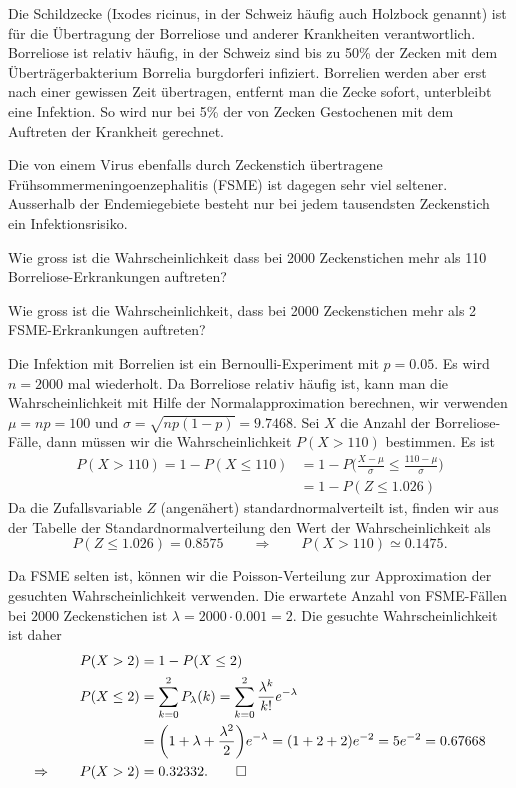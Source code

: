 Die Schildzecke (Ixodes ricinus, in der Schweiz häufig auch Holzbock genannt) 
ist für die Über\-tragung der Borreliose und anderer Krankheiten verantwortlich.
Borreliose ist relativ häufig, in der Schweiz sind bis zu 50\% der Zecken mit
dem Überträgerbakterium Borrelia burgdorferi infiziert.
Borrelien werden aber erst nach einer gewissen Zeit übertragen,
entfernt man die Zecke sofort, unterbleibt eine Infektion.
So wird nur bei 5\% der von Zecken Gestochenen mit dem Auftreten
der Krankheit gerechnet.

Die von einem Virus ebenfalls durch Zeckenstich übertragene
Frühsommermeningoenzephalitis (FSME) ist dagegen sehr viel seltener.
Ausserhalb der Endemiegebiete besteht nur bei jedem tausendsten Zeckenstich
ein Infektionsrisiko.

\begin{teilaufgaben}
\item
Wie gross ist die Wahrscheinlichkeit dass bei 2000 Zeckenstichen mehr als 110
Borreliose-Erkrankungen auftreten?
\item
Wie gross ist die Wahrscheinlichkeit, dass bei 2000 Zeckenstichen mehr als 2
FSME-Er\-kran\-kun\-gen auftreten?
\end{teilaufgaben}

\begin{loesung}
\begin{teilaufgaben}
\item
Die Infektion mit Borrelien ist ein Bernoulli-Experiment mit $p=0.05$.
Es wird $n=2000$ mal wiederholt.
Da Borreliose relativ häufig ist, kann man die Wahrscheinlichkeit mit
Hilfe der Normalapproximation berechnen, wir verwenden
$\mu=np=100$ und $\sigma=\sqrt{np(1-p)}=9.7468$.
Sei $X$ die Anzahl der Borreliose-Fälle, dann müssen wir die
Wahrscheinlichkeit $P(X>110)$ bestimmen.
Es ist
\begin{align*}
P(X>110)
=
1-P(X\le 110)
&=
1-P\biggl(\frac{X-\mu}{\sigma}\le \frac{110-\mu}{\sigma}\biggr)
\\
&=
1-P(Z\le 1.026)
\end{align*}
Da die Zufallsvariable $Z$ (angenähert) standardnormalverteilt ist, finden wir
aus der Tabelle der Standardnormalverteilung den Wert der Wahrscheinlichkeit
als 
\[ 
P(Z\le 1.026) = 0.8575
\qquad\Rightarrow\qquad
P(X>110)\simeq 0.1475.
\]
\item
Da FSME selten ist, können wir die Poisson-Verteilung zur Approximation der
gesuchten Wahrscheinlichkeit verwenden.
Die erwartete Anzahl von FSME-Fällen bei $2000$ Zeckenstichen ist
$\lambda = 2000\cdot 0.001=2$.
Die gesuchte Wahrscheinlichkeit ist daher
\begin{align*}
P(X>2)
&=
1-P(X\le 2)
\\
P(X\le 2)
&=
\sum_{k=0}^2 P_\lambda(k)
=
\sum_{k=0}^2 \frac{\lambda^k}{k!} e^{-\lambda}
\\
&=
\biggl(1+\lambda+\frac{\lambda^2}2\biggr) e^{-\lambda}
=
(1+2+2) e^{-2}=5e^{-2}
=
0.67668
\\
\Rightarrow\qquad
P(X>2)&=0.32332.
\qedhere
\end{align*}
\end{teilaufgaben}
\end{loesung}


